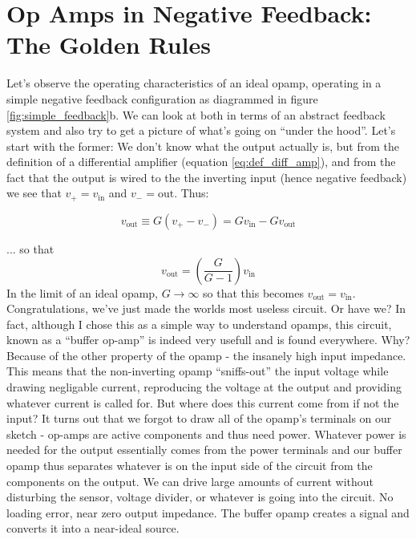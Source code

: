 \documentclass{tufte-book}
\begin{document}
\section{Op Amps in Negative Feedback: The Golden Rules}
Let's observe the operating characteristics of an ideal opamp, operating in a simple negative feedback configuration as diagrammed in figure \ref{fig:simple_feedback}b. We can look at both in terms of an abstract feedback system and also try to get a picture of what's going on ``under the hood''. Let's start with the former: We don't know what the output actually is, but from the definition of a differential amplifier (equation \ref{eq:def_diff_amp}), and from the fact that the output is wired to the the inverting input (hence negative feedback) we see that $v_+ = v_\text{in}$ and $v_-=\text{out}$. Thus:

\begin{equation*}
v_\text{out} \equiv G\left(v_+ - v_-\right)  = Gv_\text{in} - Gv_\text{out}
\end{equation*}

\noindent ... so that 
\begin{equation}
\label{eq:opamp_analysis_feedback}
v_\text{out} = \left(\frac{G}{G-1}\right)v_\text{in}
\end{equation}
In the limit of an ideal opamp, $G\rightarrow\infty$ so that this becomes $v_\text{out} = v_\text{in}$. Congratulations, we've just made the worlds most useless circuit. Or have we? In fact, although I chose this as a simple way to understand opamps, this circuit, known as a ``buffer op-amp'' is indeed very usefull and is found everywhere. Why? Because of the other property of the opamp - the insanely high input impedance. This means that the non-inverting opamp ``sniffs-out'' the input voltage while drawing negligable current, reproducing the voltage at the output and providing whatever current is called for. But where does this current come from if not the input? It turns out that we forgot to draw all of the opamp's terminals on our sketch - op-amps are active components and thus need power. Whatever power is needed for the output essentially comes from the power terminals and our buffer opamp thus separates whatever is on the input side of the circuit from the components on the output. We can drive large amounts of current without disturbing the sensor, voltage divider, or whatever is going into the circuit. No loading error, near zero output impedance. The buffer opamp creates a signal and converts it into a near-ideal source.
\end{document}
